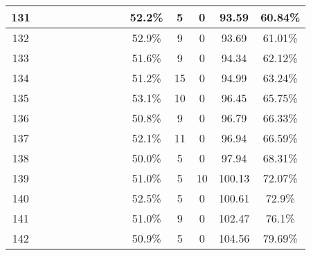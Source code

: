 \begin{longtable}{|c|c|c|c|c|c|c|c|c|c|c|c|c|c|}
131 &  \x    & \x    &       & \x    &       & \x    &       & \x    & 52.2\% &  5  & 0  & 93.59 & 60.84\% \\ \hline
132 &  \x    & \x    &       & \x    &       &       &       &       & 52.9\% &  9  & 0  & 93.69 & 61.01\% \\ \hline
133 &  \x    & \x    &       &       &       &       &       & \x    & 51.6\% &  9  & 0  & 94.34 & 62.12\% \\ \hline
134 &  \x    & \x    &       &       &       &       &       &       & 51.2\% &  15 & 0  & 94.99 & 63.24\% \\ \hline
135 &  \x    & \x    &       & \x    &       &       &       & \x\m  & 53.1\% &  10 & 0  & 96.45 & 65.75\% \\ \hline
136 &  \x    & \x    &       &       &       & \x\m  &       &       & 50.8\% &  9  & 0  & 96.79 & 66.33\% \\ \hline
137 &  \x    & \x    &       &       &       &       & \x\m  &       & 52.1\% &  11 & 0  & 96.94 & 66.59\% \\ \hline
138 &  \x    & \x    &       &       &       & \x    &       &       & 50.0\% &  5  & 0  & 97.94 & 68.31\% \\ \hline
139 &  \x    & \x    &       & \x    &       & \x\m  &       & \x\m  & 51.0\% &  5  & 10 & 100.13 & 72.07\% \\ \hline
140 &  \x    & \x    &       & \x    &       & \x\m  & \x\m  &       & 52.5\% &  5  & 0  & 100.61 & 72.9\% \\ \hline
141 &  \x    & \x    &       &       &       & \x\m  & \x\m  &       & 51.0\% &  9  & 0  & 102.47 & 76.1\% \\ \hline
142 &  \x    & \x    &       &       &       & \x    &       & \x    & 50.9\% &  5  & 0  & 104.56 & 79.69\% \\ \hline
\end{longtable}
\normalsize